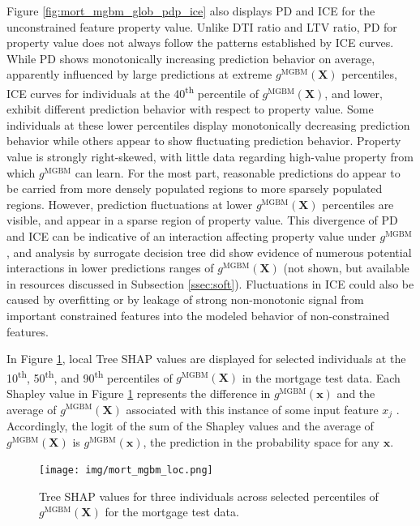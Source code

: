 \documentclass[information,article,submit,moreauthors,pdftex]{definitions/mdpi}
\begin{document}
Figure \ref{fig:mort_mgbm_glob_pdp_ice} also displays PD and ICE for the unconstrained feature property value. Unlike DTI ratio and LTV ratio, PD for property value does not always follow the patterns established by ICE curves. While PD shows monotonically increasing prediction behavior on average, apparently influenced by large predictions at extreme $g^{\text{MGBM}}(\mathbf{X})$ percentiles, ICE curves for individuals at the 40\textsuperscript{th} percentile of $g^{\text{MGBM}}(\mathbf{X})$, and lower, exhibit different prediction behavior with respect to property value. Some individuals at these lower percentiles display monotonically decreasing prediction behavior while others appear to show fluctuating prediction behavior. Property value is strongly right-skewed, with little data regarding high-value property from which $g^{\text{MGBM}}$ can learn. For the most part, reasonable predictions do appear to be carried from more densely populated regions to more sparsely populated regions. However, prediction fluctuations at lower $g^{\text{MGBM}}(\mathbf{X})$ percentiles are visible, and appear in a sparse region of property value. This divergence of PD and ICE can be indicative of an interaction affecting property value under $g^{\text{MGBM}}$ \cite{ice_plots}, and analysis by surrogate decision tree did show evidence of numerous potential interactions in lower predictions ranges of $g^{\text{MGBM}}(\mathbf{X})$ \cite{art_and_sci} (not shown, but available in resources discussed in Subsection \ref{ssec:soft}). Fluctuations in ICE could also be caused by overfitting or by leakage of strong non-monotonic signal from important constrained features into the modeled behavior of non-constrained features.

In Figure \ref{fig:mort_mgbm_loc}, local Tree SHAP values are displayed for selected individuals at the 10\textsuperscript{th}, 50\textsuperscript{th}, and 90\textsuperscript{th} percentiles of $g^{\text{MGBM}}(\mathbf{X})$ in the mortgage test data. Each Shapley value in Figure \ref{fig:mort_mgbm_loc} represents the difference in $g^\text{MGBM}(\mathbf{x})$ and the average of $g^\text{MGBM}(\mathbf{X})$ associated with this instance of some input feature $x_j$ \cite{molnar}. Accordingly, the logit of the sum of the Shapley values and the average of $g^\text{MGBM}(\mathbf{X})$ is $g^\text{MGBM}(\mathbf{x})$, the prediction in the probability space for any $\mathbf{x}$. 

\begin{figure}[htb]
\centering
\texttt{[image: img/mort\_mgbm\_loc.png]}
\caption{Tree SHAP values for three individuals across selected percentiles of $g^\text{MGBM}(\mathbf{X})$ for the mortgage test data.}
\label{fig:mort_mgbm_loc}
\end{figure}   
\end{document}
